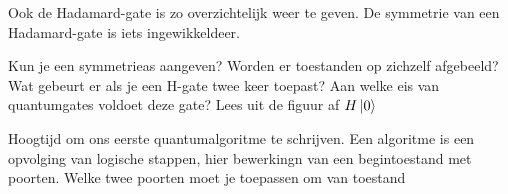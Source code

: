 \documentclass[../../main.tex]{subfiles}
\begin{document}
\begin{center}
\end{center}

Ook de Hadamard-gate is zo overzichtelijk weer te geven. De symmetrie van een Hadamard-gate is iets ingewikkeldeer.  

\normal Kun je een symmetrieas aangeven? Worden er toestanden op zichzelf afgebeeld?
Wat gebeurt er als je een H-gate twee keer toepast? Aan welke eis van quantumgates voldoet deze gate?
Lees uit de figuur af $H\ket{0}$


Hoogtijd om ons eerste quantumalgoritme te schrijven. Een algoritme is een opvolging van logische stappen, hier bewerkingn van een begintoestand met poorten. 
\easy Welke twee poorten moet je toepassen om van toestand 
\end{document}
